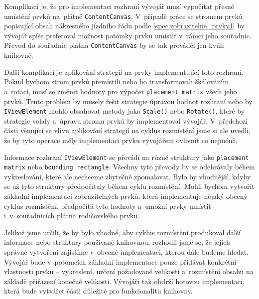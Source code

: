 Komplikací je, že pro implementaci rozhraní vývojář musí vypočítat přesné umístění prvků na~plátně \texttt{ContentCanvas}. V~případě práce se stromem prvků popisující obsah nákresného jízdního řádu podle \ref{spec:zobrazitelne_prvky1} by vývojář spíše preferoval možnost potomky prvku umístit v~rámci jeho souřadnic. Převod do souřadnic plátna \texttt{ContentCanvas} by se tak prováděl jen kvůli knihovně.

Další komplikací je aplikování strategií na prvky implementující toto rozhraní. Pokud bychom strom prvků přemístili nebo ho transformovali škálováním a~rotací, musí se změnit hodnoty pro výpočet \texttt{placement matrix} všech jeho prvků. Tento problém by musely řešit strategie úpravou hodnot rozhraní nebo by \texttt{IViewElement} mohlo obsahovat metody jako \texttt{Scale()} nebo \texttt{Rotate()}, které by strategie volaly a~úpravu stromu prvků by implementoval vývojář. V~předchozí části věnující se vlivu aplikování strategií na cyklus rozmístění jsme si ale uvedli, že by tyto operace měly implementaci prvku vývojářem ovlivnit co nejméně.

Informace rozhraní \texttt{IViewElement} se převádí na různé struktury jako \linebreak \texttt{placement matrix} nebo \texttt{bounding rectangle}. Všechny tyto převody by se odehrávaly během vykreslování, které ale nechceme zbytečně zpomalovat. Bylo by vhodnější, kdyby se už tyto struktury předpočítaly během cyklu rozmístění. Mohli bychom vytvořit základní implementaci zobrazitelných prvků, která implementuje nějaký obecný cyklus rozmístění, předpočítá tyto hodnoty a~umožní prvky umístit i~v~souřadnicích plátna rodičovského prvku.

Jelikož jsme určili, že by bylo vhodné, aby cyklus rozmístění produkoval další informace nebo struktury používané knihovnou, rozhodli jsme se, že jejich správné vytvoření zajistíme v~obecné implementaci, kterou dále budeme hledat. Vývojář bude v~potomcích základní implementace pouze přidávat konkrétní vlastnosti prvku -- vykreslení, určení požadované velikosti a~rozmístění obsahu na základě přiřazení konečné velikosti. Vývojáři tak obdrží hotovou implementaci, která bude vytvářet části důležité pro funkcionalitu knihovny.

